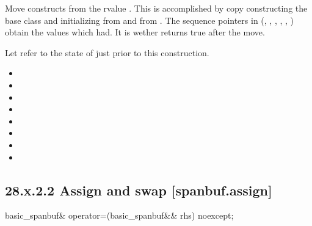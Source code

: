 \documentclass[ebook,11pt,article]{memoir}
\begin{document}
\begin{itemdescr}
\pnum
\effects 
Move constructs from the rvalue . 
This is accomplished by copy constructing the base class 
and initializing  from  and  from .
The sequence pointers in 
(, , ,
, , ) obtain
the values which  had.
It is 
wether  returns true after the move.


\pnum
\postconditions Let  refer to the state of
 just prior to this construction.

\begin{itemize}
\item {}
\item {}
\item {}
\item {}
\item {}
\item {}
\item {}
\item {}
\end{itemize}
\end{itemdescr}


\subsection{28.x.2.2 Assign and swap [spanbuf.assign]}

\begin{itemdecl}
basic_spanbuf& operator=(basic_spanbuf&& rhs) noexcept;
\end{itemdecl}
\end{document}
